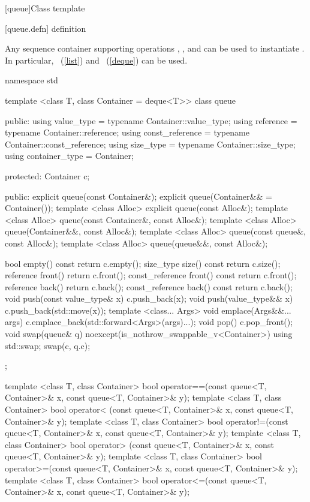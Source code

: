 [queue]{Class template }

[queue.defn]{ definition}

\pnum
{}%
Any sequence container supporting operations
,
,
and
can be used to instantiate
.
In particular,
~(\ref{list})
and
~(\ref{deque})
can be used.

\begin{codeblock}
namespace std {
  template <class T, class Container = deque<T>>
  class queue {
  public:
    using value_type      = typename Container::value_type;
    using reference       = typename Container::reference;
    using const_reference = typename Container::const_reference;
    using size_type       = typename Container::size_type;
    using container_type  =          Container;

  protected:
    Container c;

  public:
    explicit queue(const Container&);
    explicit queue(Container&& = Container());
    template <class Alloc> explicit queue(const Alloc&);
    template <class Alloc> queue(const Container&, const Alloc&);
    template <class Alloc> queue(Container&&, const Alloc&);
    template <class Alloc> queue(const queue&, const Alloc&);
    template <class Alloc> queue(queue&&, const Alloc&);

    bool              empty() const     { return c.empty(); }
    size_type         size()  const     { return c.size(); }
    reference         front()           { return c.front(); }
    const_reference   front() const     { return c.front(); }
    reference         back()            { return c.back(); }
    const_reference   back() const      { return c.back(); }
    void push(const value_type& x)      { c.push_back(x); }
    void push(value_type&& x)           { c.push_back(std::move(x)); }
    template <class... Args>
      void emplace(Args&&... args)      { c.emplace_back(std::forward<Args>(args)...); }
    void pop()                          { c.pop_front(); }
    void swap(queue& q) noexcept(is_nothrow_swappable_v<Container>)
      { using std::swap; swap(c, q.c); }
  };

  template <class T, class Container>
    bool operator==(const queue<T, Container>& x, const queue<T, Container>& y);
  template <class T, class Container>
    bool operator< (const queue<T, Container>& x, const queue<T, Container>& y);
  template <class T, class Container>
    bool operator!=(const queue<T, Container>& x, const queue<T, Container>& y);
  template <class T, class Container>
    bool operator> (const queue<T, Container>& x, const queue<T, Container>& y);
  template <class T, class Container>
    bool operator>=(const queue<T, Container>& x, const queue<T, Container>& y);
  template <class T, class Container>
    bool operator<=(const queue<T, Container>& x, const queue<T, Container>& y);

}
\end{codeblock}
